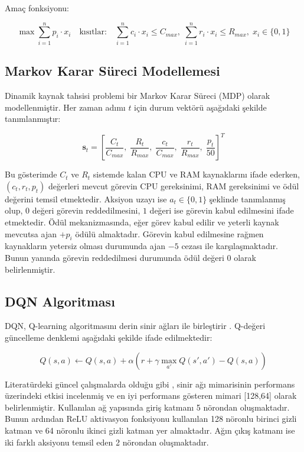 \documentclass[onecolumn]{IEEEtran}
\begin{document}
Amaç fonksiyonu:

\begin{equation}
\max \sum_{i=1}^{n} p_i \cdot x_i \quad \text{kısıtlar:} \quad \sum_{i=1}^{n} c_i \cdot x_i \leq C_{max},\; \sum_{i=1}^{n} r_i \cdot x_i \leq R_{max},\; x_i \in \{0,1\}
\end{equation}

\subsection{Markov Karar Süreci Modellemesi}

Dinamik kaynak tahsisi problemi bir Markov Karar Süreci (MDP) olarak modellenmiştir. Her zaman adımı $t$ için durum vektörü aşağıdaki şekilde tanımlanmıştır:

\begin{equation}
\mathbf{s}_t = \left[ \frac{C_t}{C_{max}},\; \frac{R_t}{R_{max}},\; \frac{c_t}{C_{max}},\; \frac{r_t}{R_{max}},\; \frac{p_t}{50} \right]^T
\end{equation}

Bu gösterimde $C_t$ ve $R_t$ sistemde kalan CPU ve RAM kaynaklarını ifade ederken, $(c_t, r_t, p_t)$ değerleri mevcut görevin CPU gereksinimi, RAM gereksinimi ve ödül değerini temsil etmektedir. Aksiyon uzayı ise $a_t \in \{0,1\}$ şeklinde tanımlanmış olup, $0$ değeri görevin reddedilmesini, $1$ değeri ise görevin kabul edilmesini ifade etmektedir. Ödül mekanizmasında, eğer görev kabul edilir ve yeterli kaynak mevcutsa ajan $+p_i$ ödülü almaktadır. Görevin kabul edilmesine rağmen kaynakların yetersiz olması durumunda ajan $-5$ cezası ile karşılaşmaktadır. Bunun yanında görevin reddedilmesi durumunda ödül değeri $0$ olarak belirlenmiştir.

\subsection{DQN Algoritması}

DQN, Q-learning algoritmasını derin sinir ağları ile birleştirir \cite{mnih2015human}. Q-değeri güncelleme denklemi aşağıdaki şekilde ifade edilmektedir:

\begin{equation}
Q(s,a) \leftarrow Q(s,a) + \alpha \left(r + \gamma \max_{a'} Q(s',a') - Q(s,a)\right)
\end{equation}

Literatürdeki güncel çalışmalarda olduğu gibi \cite{rahmani2025integrated}, sinir ağı mimarisinin performans üzerindeki etkisi incelenmiş ve en iyi performans gösteren mimari [128,64] olarak belirlenmiştir. Kullanılan ağ yapısında giriş katmanı 5 nörondan oluşmaktadır. Bunun ardından ReLU aktivasyon fonksiyonu kullanılan 128 nöronlu birinci gizli katman ve 64 nöronlu ikinci gizli katman yer almaktadır. Ağın çıkış katmanı ise iki farklı aksiyonu temsil eden 2 nörondan oluşmaktadır.
\end{document}
